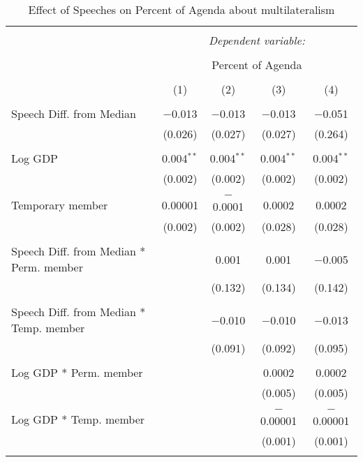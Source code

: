 
\begin{table}[!htbp] \centering 
  \caption{Effect of Speeches on Percent of Agenda about  multilateralism} 
  \label{} 
\begin{tabular}{@{\extracolsep{5pt}}lcccc} 
\\[-1.8ex]\hline 
\hline \\[-1.8ex] 
 & \multicolumn{4}{c}{\textit{Dependent variable:}} \\ 
\cline{2-5} 
\\[-1.8ex] & \multicolumn{4}{c}{Percent of Agenda} \\ 
\\[-1.8ex] & (1) & (2) & (3) & (4)\\ 
\hline \\[-1.8ex] 
 Speech Diff. from Median & $-$0.013 & $-$0.013 & $-$0.013 & $-$0.051 \\ 
  & (0.026) & (0.027) & (0.027) & (0.264) \\ 
  & & & & \\ 
 Log GDP & 0.004$^{**}$ & 0.004$^{**}$ & 0.004$^{**}$ & 0.004$^{**}$ \\ 
  & (0.002) & (0.002) & (0.002) & (0.002) \\ 
  & & & & \\ 
 Temporary member & 0.00001 & $-$0.0001 & 0.0002 & 0.0002 \\ 
  & (0.002) & (0.002) & (0.028) & (0.028) \\ 
  & & & & \\ 
 Speech Diff. from Median * Perm. member &  & 0.001 & 0.001 & $-$0.005 \\ 
  &  & (0.132) & (0.134) & (0.142) \\ 
  & & & & \\ 
 Speech Diff. from Median * Temp. member &  & $-$0.010 & $-$0.010 & $-$0.013 \\ 
  &  & (0.091) & (0.092) & (0.095) \\ 
  & & & & \\ 
 Log GDP * Perm. member &  &  & 0.0002 & 0.0002 \\ 
  &  &  & (0.005) & (0.005) \\ 
  & & & & \\ 
 Log GDP * Temp. member &  &  & $-$0.00001 & $-$0.00001 \\ 
  &  &  & (0.001) & (0.001) \\ 
  & & & & \\ 

\end{tabular}
\end{table}
